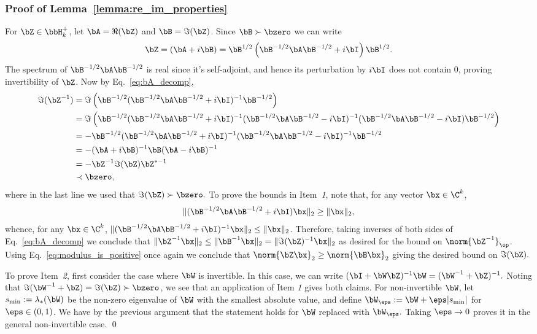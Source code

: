 \subsubsection{Proof of Lemma~\ref{lemma:re_im_properties}}
\label{sec:proof_lemma_re_im_properties}
For $\bZ\in\bbH^+_k$, let $\bA = \Re(\bZ)$ and $\bB =\Im(\bZ)$. Since $\bB \succ \bzero$ we can write
\begin{equation}
\label{eq:bA_decomp}
   \bZ = (\bA + i \bB)  =  \bB^{1/2} \left(\bB^{-1/2}\bA \bB^{-1/2} + i \bI\right) \bB^{1/2}.
\end{equation}
The spectrum of $\bB^{-1/2}\bA\bB^{-1/2}$ is real since it's self-adjoint, and hence its perturbation by $i\bI$ does not contain $0$, 
proving invertibility of $\bZ$.
Now by Eq.~\eqref{eq:bA_decomp},
   \begin{align*}
       \Im(\bZ^{-1}) 
       &=
       \Im\left(
       \bB^{-1/2}(\bB^{-1/2}\bA\bB^{-1/2} + i\bI)^{-1}\bB^{-1/2}
       \right)\\
       &=
       \Im\left(
       \bB^{-1/2}(\bB^{-1/2}\bA\bB^{-1/2} + i\bI)^{-1}
       (\bB^{-1/2}\bA\bB^{-1/2} - i\bI)^{-1}
       (\bB^{-1/2}\bA\bB^{-1/2} - i\bI)\bB^{-1/2}
       \right)\\
       &=
       -\bB^{-1/2}(\bB^{-1/2}\bA\bB^{-1/2} + i\bI)^{-1}
       (\bB^{-1/2}\bA\bB^{-1/2} - i\bI)^{-1}
       \bB^{-1/2}\\
       &= 
       -(\bA + i\bB)^{-1}
       \bB
   (\bA - i\bB)^{-1}\\
&= - \bZ^{-1} \Im(\bZ) \bZ^{*-1}\\
&\prec \bzero,
   \end{align*}
where in the last line we used that $\Im(\bZ)\succ\bzero.$
To prove the bounds in Item~\textit{1},
note that, for any vector $\bx\in \C^k$,
\begin{align}
\label{eq:modulus_is_positive}
\|(\bB^{-1/2}\bA\bB^{-1/2} + i\bI)\bx\|_2 \ge \|\bx\|_2,
\end{align}
whence, for any $\bx\in \C^k$,
$\|(\bB^{-1/2}\bA\bB^{-1/2} + i\bI)^{-1}\bx\|_2 \le \|\bx\|_2$.
Therefore, taking inverses of both sides of Eq.~\eqref{eq:bA_decomp}
we conclude that $\|\bZ^{-1}\bx\|_2 \le \|\bB^{-1}\bx\|_2 
=\|\Im(\bZ)^{-1}\bx\|_2$ as desired for the bound on $\norm{\bZ^{-1}}_\op$. Using Eq.~\eqref{eq:modulus_is_positive} once again we conclude that 
$\norm{\bZ\bx}_2 \ge \norm{\bB\bx}_2$ giving the desired bound on $\Im(\bZ).$

To prove Item~\textit{2}, first consider the case where $\bW$ is invertible. In this case, we can write
   $(\bI + \bW\bZ)^{-1} \bW = (\bW^{-1} + \bZ)^{-1}.$
Noting that $\Im(\bW^{-1} + \bZ) = \Im(\bZ) \succ \bzero$, we see that an application of Item \textit{1} gives both claims. 
For non-invertible $\bW$, let $s_{\min} := \lambda_{*}(\bW)$
be the non-zero eigenvalue of $\bW$ with the smallest absolute value,
and define $\bW_\eps := \bW + \eps |s_{\min}|$ for $\eps \in (0,1)$.
We have by the previous argument that the statement holds for $\bW$ replaced with $\bW_\eps.$ Taking $\eps\to 0$ proves it in the general non-invertible case.
\qed

